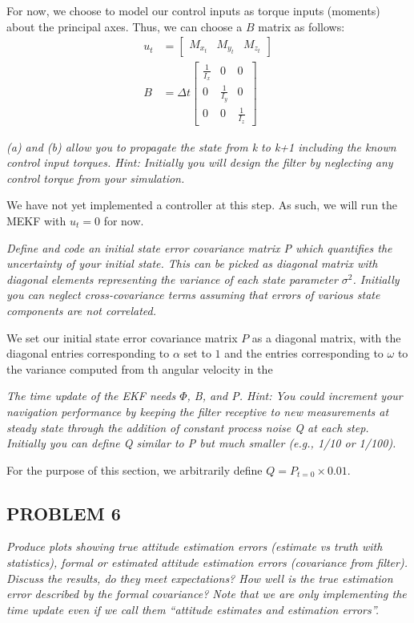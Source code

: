 For now, we choose to model our control inputs as torque inputs (moments) about the principal axes. Thus, we can choose a $B$ matrix as follows:
\begin{align*}
    u_{t} &= \begin{bmatrix}
        M_{x_{t}} & M_{y_{t}} & M_{z_{t}}
    \end{bmatrix} \\
    B &= \Delta t \begin{bmatrix}
        \frac{1}{I_{x}} & 0 & 0 \\
        0 & \frac{1}{I_{y}} & 0 \\
        0 & 0 & \frac{1}{I_{z}}
    \end{bmatrix}
\end{align*}

\textit{(a) and (b) allow you to propagate the state from k to k+1 including the known control input torques. Hint: Initially you will design the filter by neglecting any control torque from your simulation.}

We have not yet implemented a controller at this step. As such, we will run the MEKF with $u_{t} = 0$ for now.

\textit{Define and code an initial state error covariance matrix P which quantifies the uncertainty of your initial state. This can be picked as diagonal matrix with diagonal elements representing the variance of each state parameter $\sigma^{2}$. Initially you can neglect cross-covariance terms assuming that errors of various state components are not correlated.}

We set our initial state error covariance matrix $P$ as a diagonal matrix, with the diagonal entries corresponding to $\alpha$ set to $1$ and the entries corresponding to $\omega$ to the variance computed from th angular velocity in the 

\textit{The time update of the EKF needs $\Phi$, B, and P. Hint: You could increment your navigation performance by keeping the filter receptive to new measurements at steady state through the addition of constant process noise Q at each step. Initially you can define Q similar to P but much smaller (e.g., 1/10 or 1/100).}

For the purpose of this section, we arbitrarily define $Q = P_{t=0} \times 0.01$.

\subsection{PROBLEM 6}
\textit{Produce plots showing true attitude estimation errors (estimate vs truth with statistics), formal or estimated attitude estimation errors (covariance from filter). Discuss the results, do they meet expectations? How well is the true estimation error described by the formal covariance? Note that we are only implementing the time update even if we call them “attitude estimates and estimation errors”.}

